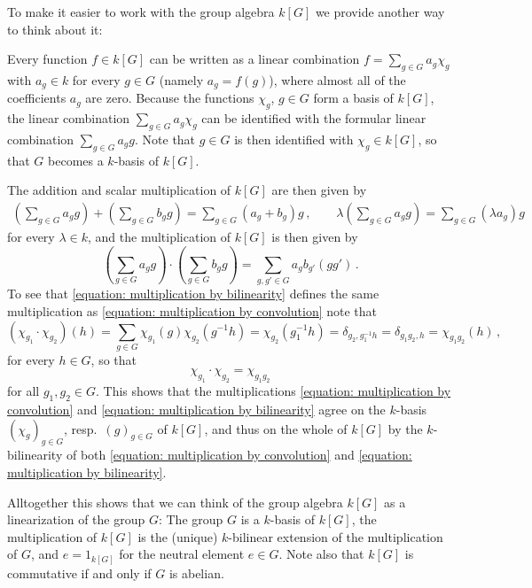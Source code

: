 \begin{fluff}
  To make it easier to work with the group algebra $k[G]$ we provide another way to think about it:

  Every function $f \in k[G]$ can be written as a linear combination $f = \sum_{g \in G} a_g \chi_g$ with $a_g \in k$ for every $g \in G$ (namely $a_g = f(g)$), where almost all of the coefficients $a_g$ are zero.
  Because the functions $\chi_g$, $g \in G$ form a basis of $k[G]$, the linear combination $\sum_{g \in G} a_g \chi_g$ can be identified with the formular linear combination $\sum_{g \in G} a_g g$.
  Note that $g \in G$ is then identified with $\chi_g \in k[G]$, so that $G$ becomes a $k$-basis of $k[G]$.
  
  The addition and scalar multiplication of $k[G]$ are then given by
  \begin{gather*}
        \left( \sum_{g \in G} a_g g \right)
      + \left( \sum_{g \in G} b_g g \right)
    = \sum_{g \in G} (a_g + b_g) g \,,
    \qquad
      \lambda \left( \sum_{g \in G} a_g g \right)
    = \sum_{g \in G} (\lambda a_g) g
  \end{gather*}
  for every $\lambda \in k$, and the multiplication of $k[G]$ is then given by
  \begin{equation}
  \label{equation: multiplication by bilinearity}
            \left( \sum_{g \in G} a_g g \right)
      \cdot \left( \sum_{g \in G} b_g g \right)
    = \sum_{g, g' \in G} a_g b_{g'} (g g') \,.
  \end{equation}
  To see that \eqref{equation: multiplication by bilinearity} defines the same multiplication as \eqref{equation: multiplication by convolution} note that
  \[
      \left( \chi_{g_1} \cdot \chi_{g_2} \right)(h)
    = \sum_{g \in G} \chi_{g_1}(g) \chi_{g_2}\left( g^{-1} h \right)
    = \chi_{g_2}\left( g_1^{-1}h \right)
    = \delta_{g_2, g_1^{-1} h}
    = \delta_{g_1 g_2, h}
    = \chi_{g_1 g_2}(h) \,,
  \]
  for every $h \in G$, so that
  \[
    \chi_{g_1} \cdot \chi_{g_2} = \chi_{g_1 g_2}
  \]
  for all $g_1, g_2 \in G$.
  This shows that the multiplications \eqref{equation: multiplication by convolution} and \eqref{equation: multiplication by bilinearity} agree on the $k$-basis $(\chi_g)_{g \in G}$, resp.\ $(g)_{g \in G}$ of $k[G]$, and thus on the whole of $k[G]$ by the $k$-bilinearity of both \eqref{equation: multiplication by convolution} and \eqref{equation: multiplication by bilinearity}.

  Alltogether this shows that we can think of the group algebra $k[G]$ as a linearization of the group $G$:
  The group $G$ is a $k$-basis of $k[G]$, the multiplication of $k[G]$ is the (unique) $k$-bilinear extension of the multiplication of $G$, and $e = 1_{k[G]}$ for the neutral element $e \in G$.
  Note also that $k[G]$ is commutative if and only if $G$ is abelian.
\end{fluff}


